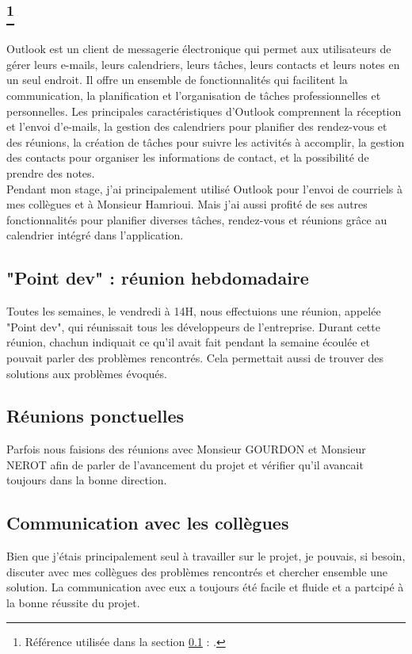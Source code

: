 \documentclass[a4paper, 12pt, french]{article}
\newcommand{\printSectionFootnote}[2]{
	\nameref{#1} \footnote{Référence utilisée dans la section \ref{#1} \nameref{#1} : \cite{#2}.}
}
\begin{document}
				\subsection[Outlook : outil de messagerie]{\printSectionFootnote{subsubsection:outlook}{wikipedia:outlook}}\label{subsubsection:outlook}
					Outlook est un client de messagerie électronique qui permet aux utilisateurs de gérer leurs e-mails, leurs calendriers, leurs tâches, leurs contacts et leurs notes en un seul endroit. Il offre un ensemble de fonctionnalités qui facilitent la communication, la planification et l'organisation de tâches professionnelles et personnelles. Les principales caractéristiques d'Outlook comprennent la réception et l'envoi d'e-mails, la gestion des calendriers pour planifier des rendez-vous et des réunions, la création de tâches pour suivre les activités à accomplir, la gestion des contacts pour organiser les informations de contact, et la possibilité de prendre des notes.\\

					Pendant mon stage, j'ai principalement utilisé Outlook pour l'envoi de courriels à mes collègues et à Monsieur Hamrioui. Mais j'ai aussi profité de ses autres fonctionnalités pour planifier diverses tâches, rendez-vous et réunions grâce au calendrier intégré dans l'application.

				\subsection{"Point dev" : réunion hebdomadaire}
					Toutes les semaines, le vendredi à 14H, nous effectuions une réunion, appelée "Point dev", qui réunissait tous les développeurs de l'entreprise. Durant cette réunion, chachun indiquait ce qu'il avait fait pendant la semaine écoulée et pouvait parler des problèmes rencontrés. Cela permettait aussi de trouver des solutions aux problèmes évoqués.

				\subsection{Réunions ponctuelles}
					Parfois nous faisions des réunions avec Monsieur GOURDON et Monsieur NEROT afin de parler de l'avancement du projet et vérifier qu'il avancait toujours dans la bonne direction.
				
				\subsection{Communication avec les collègues}
					Bien que j'étais principalement seul à travailler sur le projet, je pouvais, si besoin, discuter avec mes collègues des problèmes rencontrés et chercher ensemble une solution. La communication avec eux a toujours été facile et fluide et a partcipé à la bonne réussite du projet.
			
\end{document}
